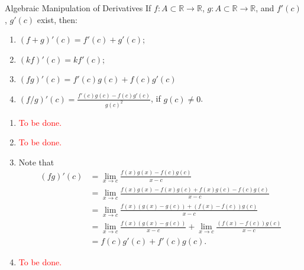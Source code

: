 
\begin{thm}{Algebraic Manipulation of Derivatives}{}
	If \(f \colon A \subset \mathbb{R} \to \mathbb{R}\), \(g \colon A \subset \mathbb{R} \to \mathbb{R}\), and \(f'(c)\), \(g'(c)\) exist, then:
	\begin{enumerate}
		\item \((f+g)'(c) = f'(c) + g'(c)\);
		\item \((kf)'(c) = kf'(c)\);
		\item \((fg)'(c) = f'(c)g(c) + f(c)g'(c)\)
		\item \((f/g)'(c) = \frac{f'(c)g(c) - f(c)g'(c)}{g(c)^2}\), if \(g(c) \neq 0\).
	\end{enumerate}
\end{thm}

\begin{dem}{}{}
	\begin{enumerate}
		\item \textcolor{red}{To be done.}
		\item \textcolor{red}{To be done.}
		\item Note that
			\begin{align*}
				(fg)'(c) &= \lim_{x \to c} \frac{f(x)g(x) - f(c)g(c)}{x-c} \\
						 &= \lim_{x \to c} \frac{f(x)g(x) - f(x)g(c) + f(x)g(c) - f(c)g(c)}{x-c} \\
						 &= \lim_{x \to c} \frac{f(x)(g(x) - g(c)) + (f(x) - f(c))g(c)}{x-c} \\
						 &= \lim_{x \to c} \frac{f(x)(g(x) - g(c))}{x - c} + \lim_{x \to c} \frac{(f(x) - f(c))g(c)}{x-c} \\
						 &= f(c)g'(c) + f'(c)g(c).
			\end{align*}
		\item \textcolor{red}{To be done.}
	\end{enumerate}
\end{dem}
